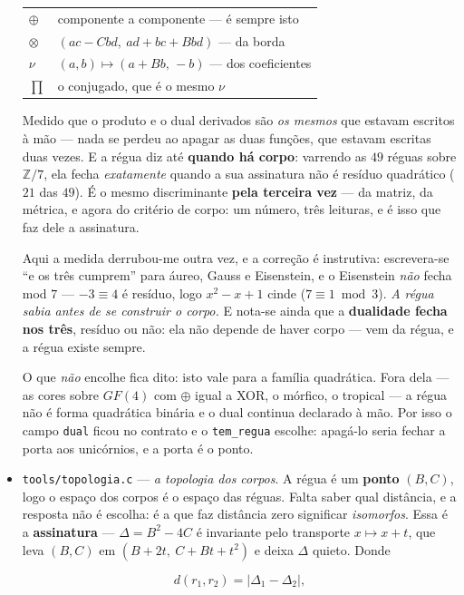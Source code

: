 \documentclass[11pt]{article}
\newcommand{\code}[1]{\texttt{\small #1}}
\newcommand{\Z}{\mathbb Z}
\theoremstyle{plain}
\theoremstyle{remark}
\begin{document}
\begin{itemize}
\begin{center}\begin{tabular}{ll}
$\oplus$ & componente a componente --- é sempre isto \\
$\otimes$ & $(ac - Cbd,\ ad + bc + Bbd)$ --- da borda \\
$\nu$ & $(a,b) \mapsto (a + Bb,\, -b)$ --- dos coeficientes \\
$\prod$ & o conjugado, que é o mesmo $\nu$ \\
\end{tabular}\end{center}

Medido que o produto e o dual derivados são \emph{os mesmos} que estavam escritos à mão --- nada
se perdeu ao apagar as duas funções, que estavam escritas duas vezes. E a régua diz até
\textbf{quando há corpo}: varrendo as $49$ réguas sobre $\Z/7$, ela fecha \emph{exatamente}
quando a sua assinatura não é resíduo quadrático ($21$ das $49$). É o mesmo discriminante
\textbf{pela terceira vez} --- da matriz, da métrica, e agora do critério de corpo: um número,
três leituras, e é isso que faz dele a assinatura.

Aqui a medida derrubou-me outra vez, e a correção é instrutiva: escrevera-se ``e os três
cumprem'' para áureo, Gauss e Eisenstein, e o Eisenstein \emph{não} fecha mod $7$ --- $-3 \equiv 4$
é resíduo, logo $x^2-x+1$ cinde ($7 \equiv 1 \bmod 3$). \emph{A régua sabia antes de se construir
o corpo.} E nota-se ainda que a \textbf{dualidade fecha nos três}, resíduo ou não: ela não depende
de haver corpo --- vem da régua, e a régua existe sempre.

O que \emph{não} encolhe fica dito: isto vale para a família quadrática. Fora dela --- as cores
sobre $GF(4)$ com $\oplus$ igual a XOR, o mórfico, o tropical --- a régua não é forma quadrática
binária e o dual continua declarado à mão. Por isso o campo \code{dual} ficou no contrato e o
\code{tem\_regua} escolhe: apagá-lo seria fechar a porta aos unicórnios, e a porta é o ponto.
\item \code{tools/topologia.c} --- \emph{a topologia dos corpos}. A régua é um \textbf{ponto}
$(B,C)$, logo o espaço dos corpos é o espaço das réguas. Falta saber qual distância, e a resposta
não é escolha: é a que faz distância zero significar \emph{isomorfos}. Essa é a \textbf{assinatura}
--- $\Delta = B^2-4C$ é invariante pelo transporte $x \mapsto x+t$, que leva $(B,C)$ em
$(B{+}2t,\ C{+}Bt{+}t^2)$ e deixa $\Delta$ quieto. Donde

\[ d(r_1, r_2) = |\Delta_1 - \Delta_2|, \]


\end{itemize}
\end{document}
